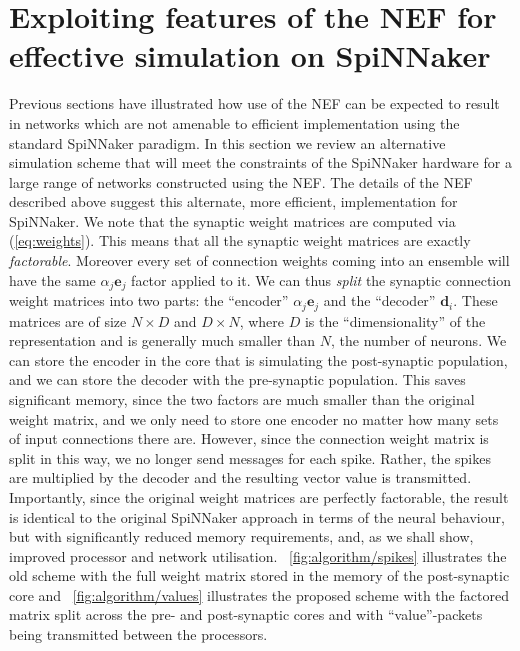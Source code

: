 \documentclass[conference]{IEEEtran}
\renewcommand{\vec}{\mathbf}  %
\begin{document}
  \section{Exploiting features of the NEF for effective simulation on SpiNNaker}
  \label{sec:exploiting}
  Previous sections have illustrated how use of the NEF can be expected to result in networks which are not amenable to efficient implementation using the standard SpiNNaker paradigm.
  In this section we review an alternative simulation scheme that will meet the constraints of the SpiNNaker hardware for a large range of networks constructed using the NEF.
  The details of the NEF described above suggest this alternate, more efficient, implementation for SpiNNaker.
  We note that the synaptic weight matrices are computed via (\ref{eq:weights}).
  This means that all the synaptic weight matrices are exactly \textit{factorable}.
  Moreover every set of connection weights coming into an ensemble will have the same $\alpha_j \vec{e}_j$ factor applied to it.
  We can thus \textit{split} the synaptic connection weight matrices into two parts: the ``encoder'' $\alpha_j \vec{e}_j$ and the ``decoder'' $\vec{d}_i$.
  These matrices are of size $N \times D$ and $D \times N$, where $D$ is the ``dimensionality'' of the representation and is generally much smaller than $N$, the number of neurons.
  We can store the encoder in the core that is simulating the post-synaptic population, and we can store the decoder with the pre-synaptic population.
  This saves significant memory, since the two factors are much smaller than the original weight matrix, and we only need to store one encoder no matter how many sets of input connections there are.
  However, since the connection weight matrix is split in this way, we no longer send messages for each spike.
  Rather, the spikes are multiplied by the decoder and the resulting vector value is transmitted.
  Importantly, since the original weight matrices are perfectly factorable, the result is identical to the original SpiNNaker approach in terms of the neural behaviour, but with significantly reduced memory requirements, and, as we shall show, improved processor and network utilisation.
  \figurename~\ref{fig:algorithm/spikes} illustrates the old scheme with the full weight matrix stored in the memory of the post-synaptic core and \figurename~\ref{fig:algorithm/values} illustrates the proposed scheme with the factored matrix split across the pre- and post-synaptic cores and with ``value''-packets being transmitted between the processors.
\end{document}
